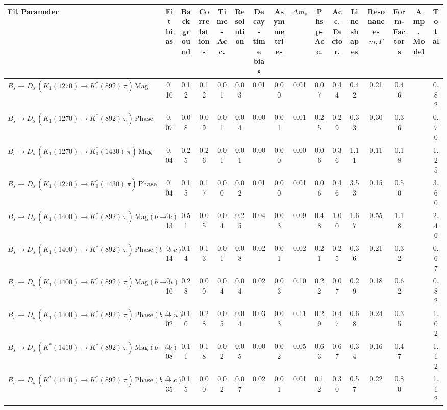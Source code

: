 \begin{tabular}{l  c  c  c  c  c  c  c  c  c  c  c  c  c  c  | c }
\hline
\hline
Fit Parameter & Fit bias & Background & Correlations & Time-Acc. & Resolution & Decay-time bias & Asymmetries & $\Delta m_{s}$ & Phsp-Acc. & Acc. Factor. & Lineshapes & Resonances $m,\Gamma$ & Form-Factors & Amp. Model &  Total  \\ 
\hline
$B_s \to D_s \, ( K_1(1270) \to K^{*}(892) \, \pi ) \, \text{Mag}$ & 0.10 & 0.12 & 0.12 & 0.01 & 0.03 & 0.01 & 0.00 & 0.01 & 0.07 & 0.44 & 0.42 & 0.21 & 0.46 &  & 0.82 \\ 
$B_s \to D_s \, ( K_1(1270) \to K^{*}(892) \, \pi ) \, \text{Phase}$ & 0.07 & 0.08 & 0.09 & 0.01 & 0.04 & 0.00 & 0.01 & 0.01 & 0.25 & 0.29 & 0.33 & 0.30 & 0.36 &  & 0.70 \\ 
$B_s \to D_s \, ( K_1(1270) \to K^{*}_{0}(1430) \, \pi ) \, \text{Mag} $ & 0.04 & 0.25 & 0.26 & 0.01 & 0.01 & 0.00 & 0.00 & 0.00 & 0.06 & 0.36 & 1.11 & 0.11 & 0.18 &  & 1.25 \\ 
$B_s \to D_s \, ( K_1(1270) \to K^{*}_{0}(1430) \, \pi ) \, \text{Phase} $ & 0.04 & 0.15 & 0.17 & 0.00 & 0.02 & 0.01 & 0.00 & 0.01 & 0.06 & 0.46 & 3.53 & 0.15 & 0.50 &  & 3.60 \\ 
$B_s \to D_s \, ( K_1(1400) \to K^{*}(892) \, \pi ) \, \text{Mag} (b \to c)$ & 0.13 & 0.51 & 0.05 & 0.04 & 0.25 & 0.04 & 0.03 & 0.09 & 0.48 & 1.00 & 1.67 & 0.55 & 1.18 &  & 2.46 \\ 
$B_s \to D_s \, ( K_1(1400) \to K^{*}(892) \, \pi ) \, \text{Phase} (b \to c)$ & 0.14 & 0.14 & 0.13 & 0.01 & 0.08 & 0.02 & 0.01 & 0.02 & 0.21 & 0.25 & 0.36 & 0.21 & 0.32 &  & 0.67 \\ 
$B_s \to D_s \, ( K_1(1400) \to K^{*}(892) \, \pi ) \, \text{Mag} (b \to u)$ & 0.10 & 0.28 & 0.00 & 0.04 & 0.04 & 0.02 & 0.03 & 0.10 & 0.22 & 0.07 & 0.29 & 0.18 & 0.62 &  & 0.82 \\ 
$B_s \to D_s \, ( K_1(1400) \to K^{*}(892) \, \pi ) \, \text{Phase} (b \to u)$ & 0.02 & 0.10 & 0.28 & 0.05 & 0.04 & 0.03 & 0.03 & 0.11 & 0.29 & 0.47 & 0.68 & 0.24 & 0.35 &  & 1.02 \\ 
$B_s \to D_s \, ( K^{*}(1410) \to K^{*}(892) \, \pi ) \, \text{Mag} (b \to c)$ & 0.08 & 0.11 & 0.18 & 0.02 & 0.05 & 0.00 & 0.02 & 0.05 & 0.63 & 0.67 & 0.34 & 0.16 & 0.47 &  & 1.12 \\ 
$B_s \to D_s \, ( K^{*}(1410) \to K^{*}(892) \, \pi ) \, \text{Phase} (b \to c)$ & 0.35 & 0.15 & 0.00 & 0.02 & 0.07 & 0.02 & 0.01 & 0.01 & 0.12 & 0.30 & 0.57 & 0.22 & 0.80 &  & 1.12 \\ 

\end{tabular}
